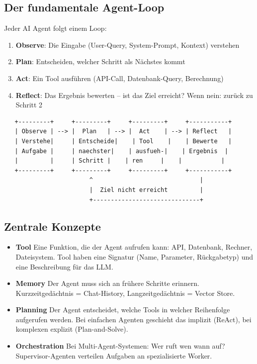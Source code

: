 \subsection{Der fundamentale Agent-Loop}

Jeder AI Agent folgt einem Loop:

\begin{enumerate}[leftmargin=*]
    \item \textbf{Observe}: Die Eingabe (User-Query, System-Prompt, Kontext) verstehen
    \item \textbf{Plan}: Entscheiden, welcher Schritt als Nächstes kommt
    \item \textbf{Act}: Ein Tool ausführen (API-Call, Datenbank-Query, Berechnung)
    \item \textbf{Reflect}: Das Ergebnis bewerten -- ist das Ziel erreicht? Wenn nein: zurück zu Schritt 2
\end{enumerate}

\begin{verbatim}
   +---------+     +---------+     +---------+     +-----------+
   | Observe | --> |  Plan   | --> |  Act    | --> | Reflect   |
   | Verstehe|     | Entscheide|    | Tool    |    | Bewerte   |
   | Aufgabe |     | naechster|    | ausfueh-|    | Ergebnis  |
   |         |     | Schritt |    | ren     |    |           |
   +---------+     +---------+     +---------+     +-----------+
                        ^                              |
                        |  Ziel nicht erreicht         |
                        +------------------------------+
\end{verbatim}

\subsection{Zentrale Konzepte}

\begin{itemize}

    \item \textbf{Tool} Eine Funktion, die der Agent aufrufen kann: API, Datenbank, Rechner, Dateisystem. Tool haben eine Signatur (Name, Parameter, Rückgabetyp) und eine Beschreibung für das LLM.
    \item \textbf{Memory} Der Agent muss sich an frühere Schritte erinnern. Kurzzeitgedächtnis = Chat-History, Langzeitgedächtnis = Vector Store.
    \item \textbf{Planning} Der Agent entscheidet, welche Tools in welcher Reihenfolge aufgerufen werden. Bei einfachen Agenten geschieht das implizit (ReAct), bei komplexen explizit (Plan-and-Solve).
    \item \textbf{Orchestration} Bei Multi-Agent-Systemen: Wer ruft wen wann auf? Supervisor-Agenten verteilen Aufgaben an spezialisierte Worker.
\end{itemize}

